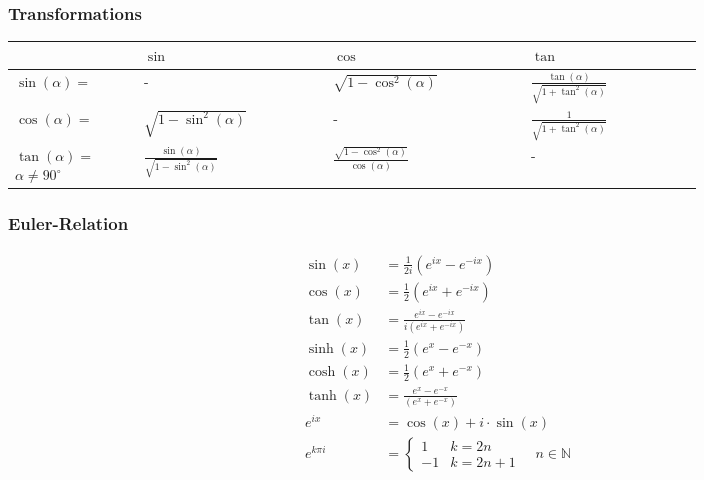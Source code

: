 \subsubsection{Transformations}
\begin{tabular}{ m{0.15\linewidth} | m{0.22\linewidth} | m{0.23\linewidth} | m{0.2\linewidth} } %
                                                    & $\sin$                                         & $\cos$                                         & $\tan$                                         \\
    \hline{} %
    $\sin(\alpha)=$                                 & -                                              & $\sqrt{1-\cos^2(\alpha)}$                      & $\frac{\tan(\alpha)}{\sqrt{1+\tan^2(\alpha)}}$ \\
    \hline{} %
    $\cos(\alpha)=$                                 & $\sqrt{1-\sin^2(\alpha)}$                      & -                                              & $\frac{1}{\sqrt{1+\tan^2(\alpha)}}$            \\
    \hline{} %
    $\tan(\alpha)=$ \newline $\alpha \neq 90^\circ$ & $\frac{\sin(\alpha)}{\sqrt{1-\sin^2(\alpha)}}$ & $\frac{\sqrt{1-\cos^2(\alpha)}}{\cos(\alpha)}$ & -
\end{tabular}

\subsubsection{Euler-Relation}
\begin{align*}
    \sin(x)    & =\frac{1}{2i}(e^{ix}-e^{-ix})             \\
    \cos(x)    & =\frac{1}{2}(e^{ix}+e^{-ix})              \\
    \tan(x)    & =\frac{e^{ix}-e^{-ix}}{i(e^{ix}+e^{-ix})} \\
    \sinh(x)   & =\frac{1}{2}(e^{x}-e^{-x})                \\
    \cosh(x)   & =\frac{1}{2}(e^{x}+e^{-x})                \\
    \tanh(x)   & =\frac{e^{x}-e^{-x}}{(e^{x}+e^{-x})}      \\
    e^{ix}     & = \cos(x) + i \cdot \sin(x)               \\
    e^{k\pi i} & = \begin{cases}
                       1  & k = 2n      \\
                       -1 & k = 2n + 1
                   \end{cases} \quad n \in \mathbb{N}
\end{align*}

